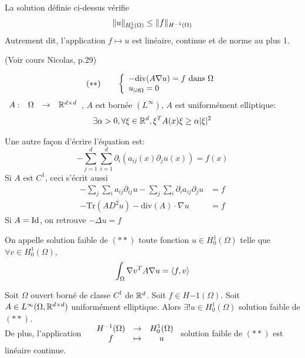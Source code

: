 \documentclass[]{report}
\begin{document}
    \begin{prop}{}{}
        La solution définie ci-dessus vérifie
        \[\lVert u \rVert_{H_0^1(\Omega)}\le \lVert f \rVert_{H^{-1}(\Omega)}\]
        Autrement dit, l'application $f\mapsto u$ est linéaire, continue et de norme au plus 1.
    \end{prop}

    (Voir cours Nicolas, p.29)

    \[(**)\qquad\left\{\begin{array}{ll} -\text{div}(A\nabla u)=f\text{ dans $\Omega$}\\ u_{|\partial \Omega}=0 \end{array} \right.\]
    $\begin{array}{ccccc} A : & \Omega & \to & \mathbb{R}^{d\times d} \end{array}$, $A$ est bornée $(L^\infty)$, $A$ est uniformément elliptique:
    \[\exists \alpha>0,\forall \xi\in \mathbb{R}^d,\xi^{T}A(x)\xi\ge \alpha |\xi|^2\]

    \begin{re}{}{}
        Une autre façon d'écrire l'équation est:
        \[-\sum_{j=1}^d\sum_{i=1}^{d}\partial_i (a_{ij}(x)\partial_j u(x))=f(x)\]
        Si $A$ est $C^1$, ceci s'écrit aussi
        \begin{align*}
            -\sum_j\sum_i a_{ij} \partial_{ij} u - \sum_j \sum_i \partial_i a_{ij}\partial_{j}u&=f\\
            -\text{Tr} (AD^2u) -\text{div}(A)\cdot \nabla u&= f
        \end{align*}
        Si $A=\text{Id}$, on retrouve $-\Delta u =f$
    \end{re}

    \begin{df}{}{}
        On appelle solution faible de $(**)$ toute fonction $u\in H_0^1(\Omega)$ telle que $\forall v\in H_0^1(\Omega)$,
        \[\int_{\Omega} \nabla v^T A\nabla u=\langle f,v \rangle\]
    \end{df}
    
    \begin{tm}{}{}
        Soit $\Omega$ ouvert borné de classe $C^1$ de $\mathbb{R}^d$. Soit $f\in H{-1}(\Omega)$. Soit $A\in L^\infty(\Omega,\mathbb{R}^{d\times d})$ uniformément elliptique. Alors $\exists! u \in H_0^1(\Omega)$ solution faible de $(**)$.\\
        De plus, l'application $\begin{array}{ccccc} & H^{-1}(\Omega) & \to & H_0^1(\Omega) \\ & f & \mapsto & u \end{array}$ solution faible de $(**)$ est linéaire continue.
    \end{tm}
\end{document}
